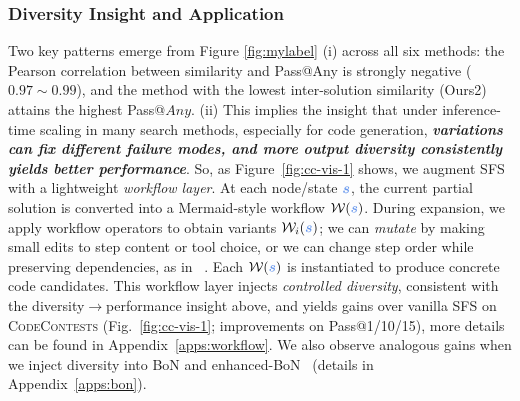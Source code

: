 \documentclass{article} %
\theoremstyle{definition}
\theoremstyle{remark}
\begin{document}
\subsubsection{Diversity Insight and Application}
\label{diversity}
Two key patterns emerge from Figure \ref{fig:mylabel} (i) across all six methods: the Pearson correlation between similarity and Pass@Any is strongly negative ($0.97\!\sim\!0.99$), and the method with the lowest inter-solution similarity (Ours2) attains the highest Pass@\!$Any$. (ii) This implies the insight that under inference-time scaling in many search methods, especially for code generation, \textbf{\textit{variations can fix different failure modes, and more output diversity consistently yields better performance}}. So, as Figure~\ref{fig:cc-vis-1} shows, we augment SFS~\citep{light2025sfs} with a lightweight \emph{workflow layer}.
At each node/state $\textcolor{lightblue}{\boldsymbol{s}}$, the current partial solution is converted into a Mermaid-style
workflow $\mathcal{W}(\textcolor{lightblue}{\boldsymbol{s}})$. During expansion, we apply workflow operators to obtain variants $\mathcal{W}_i(\textcolor{lightblue}{\boldsymbol{s}})$; we can \textit{mutate} by making small edits to step content or tool choice, or we can change step order while preserving dependencies, as in ~\citep{zheng2025mermaidflow}. Each  $\mathcal{W}(\textcolor{lightblue}{\boldsymbol{s}})$ is instantiated to produce concrete code candidates.
This workflow layer injects \emph{controlled diversity}, consistent with the
diversity\(\rightarrow\)performance insight above, and yields gains over vanilla
SFS on \textsc{CodeContests} (Fig.~\ref{fig:cc-vis-1}; improvements on Pass@1/10/15), more details can be found in Appendix~\ref{apps:workflow}. We also observe analogous gains when we inject diversity into BoN and enhanced-BoN~\citep{wang2025diversified} (details in Appendix~\ref{apps:bon}).
\end{document}
